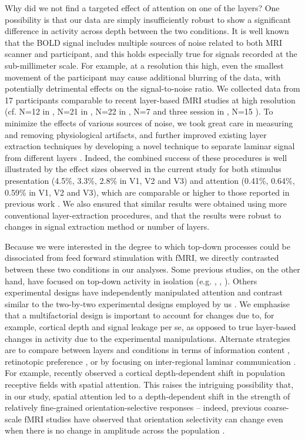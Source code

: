 \documentclass[9pt,lineno]{aperture}
\begin{document}
Why did we not find a targeted effect of attention on one of the layers? One possibility is that our data are simply insufficiently robust to show a significant difference in activity across depth between the two conditions. It is well known that the BOLD signal includes multiple sources of noise related to both MRI scanner and participant, and this holds especially true for signals recorded at the sub-millimeter scale. For example, at a resolution this high, even the smallest movement of the participant may cause additional blurring of the data, with potentially detrimental effects on the signal-to-noise ratio. We collected data from 17 participants comparable to recent layer-based fMRI studies at high resolution (cf. N=12 in \citet{Klein2018}, N=21 in \citet{Lawrence2018}, N=22 in \citep{Sharoh2019}, N=7 and three session in \citet{DeHollander2020}, N=15 \citet{Liu2020}). To minimize the effects of various sources of noise, we took great care in measuring and removing physiological artifacts, and further improved existing layer extraction techniques by developing a novel technique to separate laminar signal from different layers \citep{VanMourik2019}. Indeed, the combined success of these procedures is well illustrated by the effect sizes observed in the current study for both stimulus presentation (4.5\%, 3.3\%, 2.8\% in V1, V2 and V3) and attention (0.41\%, 0.64\%, 0.59\% in V1, V2 and V3), which are comparable or higher to those reported in previous work \citep{Murray2008,Jehee2011}. We also ensured that similar results were obtained using more conventional layer-extraction procedures, and that the results were robust to changes in signal extraction method or number of layers.

 Because we were interested in the degree to which top-down processes could be dissociated from feed forward stimulation with fMRI, we directly contrasted between these two conditions in our analyses. Some previous studies, on the other hand, have focused on top-down activity in isolation (e.g. \citet{Muckli2015}, \citet{Kok2016}, \citet{Lawrence2018}). Others experimental designs have independently manipulated attention and contrast similar to the two-by-two experimental designs employed by us \citet{DeHollander2020,Liu2020,Lawrence2019}. We emphasise that a multifactorial design is important to account for changes due to, for example, cortical depth and signal leakage per se, as opposed to true layer-based changes in activity due to the experimental manipulations. Alternate strategies are to compare between layers and conditions in terms of information content \citep{Muckli2015}, retinotopic preference \citep{Klein2018}, or by focusing on inter-regional laminar communication \citep{Sharoh2019}. For example, \citet{Klein2018} recently observed a cortical depth-dependent shift in population receptive fields with spatial attention. This raises the intriguing possibility that, in our study, spatial attention led to a depth-dependent shift in the strength of relatively fine-grained orientation-selective responses – indeed, previous coarse-scale fMRI studies have observed that orientation selectivity can change even when there is no change in amplitude across the population \citep{Jehee2011,Jehee2012}.
 
\end{document}
